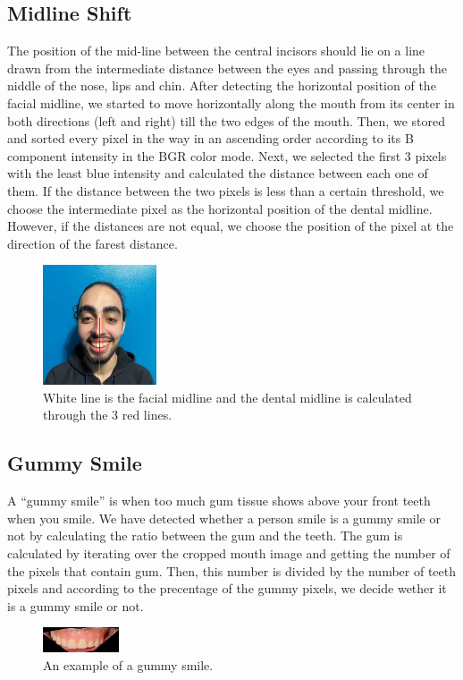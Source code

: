\documentclass[conference,twocolumn]{IEEEtran}
\begin{document}
\subsection{Midline Shift}
The position of the mid-line between the central incisors should lie on a line drawn from the intermediate distance between the eyes and passing through the niddle of the nose, lips and chin.
After detecting the horizontal position of the facial midline, we started to move horizontally along the mouth from its center in both directions (left and right) till the two edges of the mouth.
Then, we stored and sorted every pixel in the way in an ascending order according to its B component intensity in the BGR color mode.
Next, we selected the first 3 pixels with the least blue intensity and calculated the distance between each one of them.
If the distance between the two pixels is less than a certain threshold, we choose the intermediate pixel as the horizontal position of the dental midline.
However, if the distances are not equal, we choose the position of the pixel at the direction of the farest distance. 
\begin{figure}[H]
    \centering
    \includegraphics[width=0.3\textwidth]{midline_shift.png}
    \caption{White line is the facial midline and the dental midline is calculated through the 3 red lines.}
    \label{fig:my_label}
\end{figure}
\subsection{Gummy Smile}
A “gummy smile” is when too much gum tissue shows above your front teeth when you smile.
We have detected whether a person smile is a gummy smile or not by calculating the ratio between the gum and the teeth.
The gum is calculated by iterating over the cropped mouth image and getting the number of the pixels that contain gum. Then, this number is divided by the number of teeth pixels and according to the precentage of the gummy pixels, we decide wether it is a gummy smile or not.
\begin{figure}[H]
    \centering
    \includegraphics[width=0.2\textwidth]{gummy_smile.png}
    \caption{An example of a gummy smile.}
    \label{fig:my_label}
\end{figure}
\end{document}
